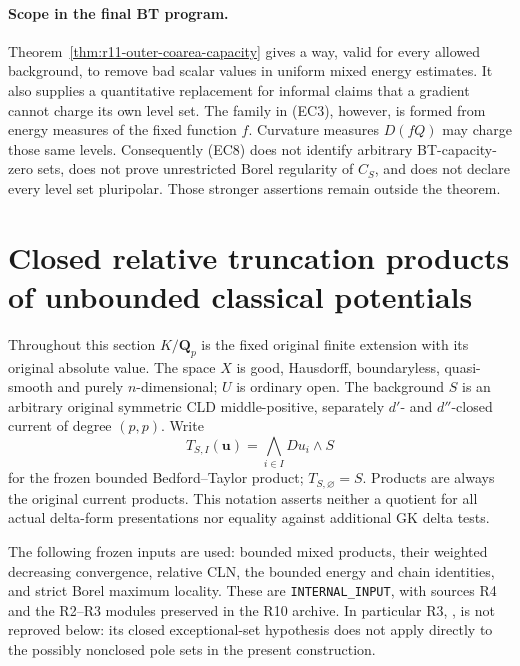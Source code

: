 \documentclass[11pt,a4paper]{article}
\numberwithin{equation}{section}
\theoremstyle{definition}
\theoremstyle{remark}
\begin{document}
\paragraph{Scope in the final BT program.}
Theorem~\ref{thm:r11-outer-coarea-capacity} gives a way, valid for every allowed background, to remove bad
scalar values in uniform mixed energy estimates.  It also supplies a quantitative replacement
for informal claims that a gradient cannot charge its own
level set.  The family in (EC3), however, is formed from
energy measures of the fixed function $f$.  Curvature measures
$D(fQ)$ may charge those same levels.  Consequently (EC8)
does not identify arbitrary BT-capacity-zero sets, does not
prove unrestricted Borel regularity of $C_S$, and does not
declare every level set pluripolar.  Those stronger assertions
remain outside the theorem.



\section{Closed relative truncation products of unbounded classical potentials}
\label{sec:r11-relative-truncation}

Throughout this section $K/\mathbf Q_p$ is the fixed original finite
extension with its original absolute value.  The space $X$ is good,
Hausdorff, boundaryless, quasi-smooth and purely $n$-dimensional; $U$ is
ordinary open.  The background $S$ is an arbitrary original symmetric
CLD middle-positive, separately $d'$- and $d''$-closed current of
degree $(p,p)$.  Write
\[
 T_{S,I}(\mathbf u)=\bigwedge_{i\in I}D u_i\wedge S
\]
for the frozen bounded Bedford--Taylor product; $T_{S,\varnothing}=S$.
Products are always the original current products.  This notation
asserts neither a quotient for all actual delta-form presentations nor
equality against additional GK delta tests.

The following frozen inputs are used: bounded mixed products, their
weighted decreasing convergence, relative CLN, the bounded energy and
chain identities, and strict Borel maximum locality.  These are
\texttt{INTERNAL\_INPUT}, with sources R4 and the R2--R3 modules
preserved in the R10 archive.  In particular R3,
, is not reproved below: its
closed exceptional-set hypothesis does not apply directly to the
possibly nonclosed pole sets in the present construction.
\end{document}
